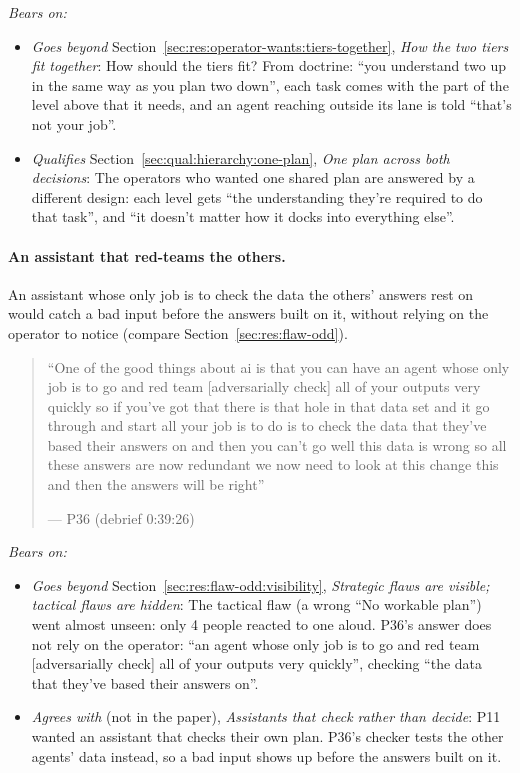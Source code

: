 \noindent\textit{Bears on:}
\begin{itemize}[leftmargin=1.2em,itemsep=1pt]\small
\item \textit{Goes beyond} Section~\ref{sec:res:operator-wants:tiers-together}, \emph{How the two tiers fit together}: How should the tiers fit? From doctrine: ``you understand two up in the same way as you plan two down'', each task comes with the part of the level above that it needs, and an agent reaching outside its lane is told ``that's not your job''.
\item \textit{Qualifies} Section~\ref{sec:qual:hierarchy:one-plan}, \emph{One plan across both decisions}: The operators who wanted one shared plan are answered by a different design: each level gets ``the understanding they're required to do that task'', and ``it doesn't matter how it docks into everything else''.
\end{itemize}


\label{sec:qual:practitioner:pt-red-team}\paragraph{An assistant that red-teams the others.}
An assistant whose only job is to check the data the others' answers rest on would catch a bad input before the answers built on it, without relying on the operator to notice (compare Section~\ref{sec:res:flaw-odd}).

\begin{quote}\small
``One of the good things about ai is that you can have an agent whose only job is to go and red team [adversarially check] all of your outputs very quickly so if you've got that there is that hole in that data set and it go through and start all your job is to do is to check the data that they've based their answers on and then you can't go well this data is wrong so all these answers are now redundant we now need to look at this change this and then the answers will be right''\par\hfill--- P36 (debrief 0:39:26)
\end{quote}

\noindent\textit{Bears on:}
\begin{itemize}[leftmargin=1.2em,itemsep=1pt]\small
\item \textit{Goes beyond} Section~\ref{sec:res:flaw-odd:visibility}, \emph{Strategic flaws are visible; tactical flaws are hidden}: The tactical flaw (a wrong ``No workable plan'') went almost unseen: only 4 people reacted to one aloud. P36's answer does not rely on the operator: ``an agent whose only job is to go and red team [adversarially check] all of your outputs very quickly'', checking ``the data that they've based their answers on''.
\item \textit{Agrees with} (not in the paper), \emph{Assistants that check rather than decide}: P11 wanted an assistant that checks their own plan. P36's checker tests the other agents' data instead, so a bad input shows up before the answers built on it.
\end{itemize}

